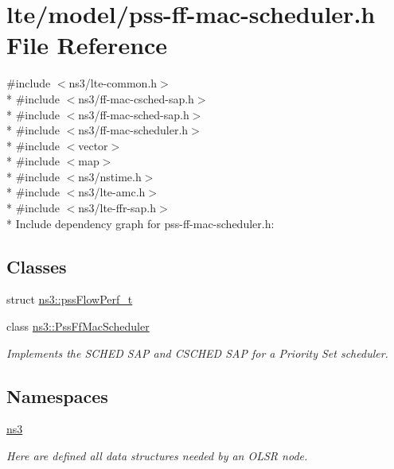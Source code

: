 \hypertarget{lte_2model_2pss-ff-mac-scheduler_8h}{}\section{lte/model/pss-\/ff-\/mac-\/scheduler.h File Reference}
\label{lte_2model_2pss-ff-mac-scheduler_8h}
{\ttfamily \#include $<$ns3/lte-\/common.\+h$>$}\\*
{\ttfamily \#include $<$ns3/ff-\/mac-\/csched-\/sap.\+h$>$}\\*
{\ttfamily \#include $<$ns3/ff-\/mac-\/sched-\/sap.\+h$>$}\\*
{\ttfamily \#include $<$ns3/ff-\/mac-\/scheduler.\+h$>$}\\*
{\ttfamily \#include $<$vector$>$}\\*
{\ttfamily \#include $<$map$>$}\\*
{\ttfamily \#include $<$ns3/nstime.\+h$>$}\\*
{\ttfamily \#include $<$ns3/lte-\/amc.\+h$>$}\\*
{\ttfamily \#include $<$ns3/lte-\/ffr-\/sap.\+h$>$}\\*
Include dependency graph for pss-\/ff-\/mac-\/scheduler.h\+:
\subsection*{Classes}
\begin{DoxyCompactItemize}
\item 
struct \hyperlink{structns3_1_1pssFlowPerf__t}{ns3\+::pss\+Flow\+Perf\+\_\+t}
\item 
class \hyperlink{classns3_1_1PssFfMacScheduler}{ns3\+::\+Pss\+Ff\+Mac\+Scheduler}
\begin{DoxyCompactList}\small\item\em Implements the S\+C\+H\+ED S\+AP and C\+S\+C\+H\+ED S\+AP for a Priority Set scheduler. \end{DoxyCompactList}\end{DoxyCompactItemize}
\subsection*{Namespaces}
\begin{DoxyCompactItemize}
\item 
 \hyperlink{namespacens3}{ns3}
\begin{DoxyCompactList}\small\item\em Here are defined all data structures needed by an O\+L\+SR node. \end{DoxyCompactList}\end{DoxyCompactItemize}
